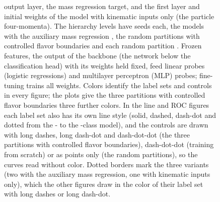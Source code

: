 \begin{figure}[tbp]
{output layer, the mass regression target, and the first layer and initial weights of the model with
kinematic inputs only (the particle four-momenta). The hierarchy levels have \MlstNRunsWord{} seeds
each, the models with the auxiliary mass regression \MlstMassNRunsWord{}, the random partitions with
controlled flavor boundaries \RandFlavRuns{} and each random partition \RandVtwoRuns{}. Frozen
features, the output of the backbone (the network below the classification head) with its weights held
fixed, feed linear probes (logistic regressions) and multilayer perceptron (MLP) probes; fine-tuning
trains all weights. Colors identify the label sets and controls in every figure; the plots give the three partitions with
controlled flavor boundaries three further colors. In the line and ROC figures each label set also
has its own line style (solid, dashed, dash-dot and dotted from the \Kfull- to the \Kcoarse-class model), and
the controls are drawn with long dashes, long dash-dot and dash-dot-dot (the three partitions with controlled
flavor boundaries), dash-dot-dot (training from scratch) or as points only (the random partitions), so the
curves read without color. Dotted borders mark the three variants (two with the auxiliary mass regression,
one with kinematic inputs only), which the other figures draw in the color of their label set with long
dashes or long dash-dot.}
\label{fig:design}
\end{figure}
